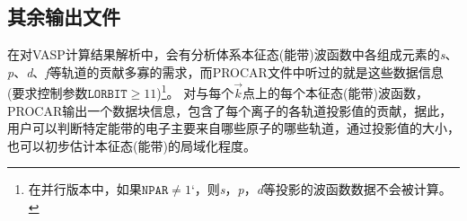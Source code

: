 \subsection{其余输出文件}
%
在对\textrm{VASP}计算结果解析中，会有分析体系本征态(能带)波函数中各组成元素的\textit{s}、\textit{p}、\textit{d}、\textit{f}等轨道的贡献多寡的需求，而\textrm{PROCAR}文件中听过的就是这些数据信息(要求控制参数$\mathtt{LORBIT}\geqslant11$)\footnote{在并行版本中，如果$\mathtt{NPAR}\neq1$`，则\textit{s}，\textit{p}，\textit{d}等投影的波函数数据不会被计算。}。
{\fontsize{8.2pt}{6.2pt}\selectfont{
}}
对与每个$\vec k$点上的每个本征态(能带)波函数，\textrm{PROCAR}输出一个数据块信息，包含了每个离子的各轨道投影值的贡献，据此，用户可以判断特定能带的电子主要来自哪些原子的哪些轨道，通过投影值的大小，也可以初步估计本征态(能带)的局域化程度。
%
%
%
%
%
%
%
%
%
%
%
%
%
%
%
%

